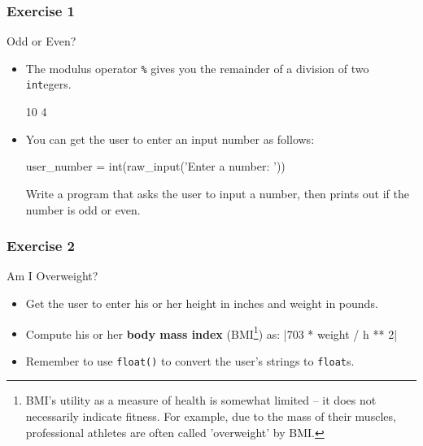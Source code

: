 \documentclass[10pt]{beamer}
\begin{document}
\begin{frame}[fragile]
  \frametitle{Exercise 1}
  \begin{block}{Odd or Even?}
    \begin{itemize}
      \item The modulus operator \texttt{\%} gives you the remainder of a division of two \texttt{int}egers.
        \begin{pythoncode}
  10 %
  4 %
        \end{pythoncode}

      \item You can get the user to enter an input number as follows:
        \begin{pythoncode}
  user_number = int(raw_input('Enter a number: '))
        \end{pythoncode}
        Write a program that asks the user to input a number, then prints out if the number is odd or even.
    \end{itemize}
  \end{block}
\end{frame}
    
\begin{frame}
  \frametitle{Exercise 2}
  \begin{block}{Am I Overweight?}
    \begin{itemize}
      \item Get the user to enter his or her height in inches and weight in pounds.
      \item Compute his or her \textbf{body mass index} (BMI\footnote{BMI's utility as a measure of health is somewhat limited -- it does not necessarily indicate fitness. For example, due to the mass of their muscles, professional athletes are often called 'overweight' by BMI.}) as: 
        |703 * weight / h ** 2|
      \item Remember to use \texttt{float()} to convert the user's strings to \texttt{float}s.
    \end{itemize}
  \end{block}
\end{frame}
    
\end{document}
